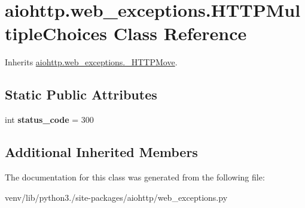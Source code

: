 \hypertarget{classaiohttp_1_1web__exceptions_1_1_h_t_t_p_multiple_choices}{}\section{aiohttp.\+web\+\_\+exceptions.\+H\+T\+T\+P\+Multiple\+Choices Class Reference}
\label{classaiohttp_1_1web__exceptions_1_1_h_t_t_p_multiple_choices}


Inherits \hyperlink{classaiohttp_1_1web__exceptions_1_1___h_t_t_p_move}{aiohttp.\+web\+\_\+exceptions.\+\_\+\+H\+T\+T\+P\+Move}.

\subsection*{Static Public Attributes}
\begin{DoxyCompactItemize}
\item 
\mbox{\label{classaiohttp_1_1web__exceptions_1_1_h_t_t_p_multiple_choices_af625395b702169a2238b7c101a31f5e7}} 
int {\bfseries status\+\_\+code} = 300
\end{DoxyCompactItemize}
\subsection*{Additional Inherited Members}


The documentation for this class was generated from the following file\+:\begin{DoxyCompactItemize}
\item 
venv/lib/python3./site-\/packages/aiohttp/web\+\_\+exceptions.\+py\end{DoxyCompactItemize}
